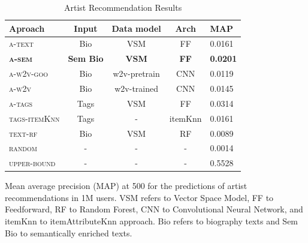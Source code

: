 \begin{table}
\begin{threeparttable}
\centering
\caption{Artist Recommendation Results}
\label{tbl:artists}
\begin{tabular}{lcccl}
\toprule
\textbf{Aproach} & \textbf{Input}   & \textbf{Data model} & \textbf{Arch} & \textbf{MAP} \\ \midrule
\textsc{a-text}                                   & Bio              & VSM                 & FF            & 0.0161                            \\ 
\textbf{\textsc{a-sem}}                           & \textbf{Sem Bio} & \textbf{VSM}        & \textbf{FF}   & \textbf{0.0201}                   \\
\textsc{a-w2v-goo}                                & Bio              & w2v-pretrain        & CNN           & 0.0119                            \\ 
\textsc{a-w2v}                                    & Bio              & w2v-trained         & CNN           & 0.0145                            \\ \midrule
\textsc{a-tags}                                   & Tags             & VSM                 & FF            & 0.0314                            \\ 
\textsc{tags-itemKnn}                                   & Tags             & -                 & itemKnn            & 0.0161                            \\ 
\textsc{text-rf}                                & Bio              & VSM                 & RF            & 0.0089                            \\ \midrule
\textsc{random}                                 & -                & -                   & -             & 0.0014                            \\
\textsc{upper-bound}                            & -                & -                   & -             & 0.5528                            \\ \bottomrule
\end{tabular}
    \begin{tablenotes}
      \small
      \item Mean average precision (MAP) at 500 for the predictions of artist recommendations in 1M users. VSM refers to Vector Space Model, FF to Feedforward, RF to Random Forest, CNN to Convolutional Neural Network, and itemKnn to itemAttributeKnn approach. Bio refers to biography texts and Sem Bio to semantically enriched texts.
    \end{tablenotes}
   \end{threeparttable}
\end{table}

